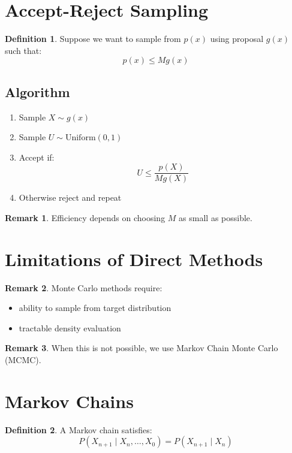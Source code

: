 \documentclass[12pt,oneside]{book}
\numberwithin{equation}{section}
\theoremstyle{definition}
\newtheorem{definition}{Definition}[section]
\newtheorem{remark}{Remark}[section]
\theoremstyle{plain}
\theoremstyle{remark}
\begin{document}
\section{Accept-Reject Sampling}

\begin{definition}
Suppose we want to sample from $p(x)$ using proposal $g(x)$ such that:
$$
p(x) \leq M g(x)
$$
\end{definition}

\subsection{Algorithm}

\begin{enumerate}
\item Sample $X \sim g(x)$
\item Sample $U \sim \text{Uniform}(0,1)$
\item Accept if:
$$
U \leq \frac{p(X)}{M g(X)}
$$
\item Otherwise reject and repeat
\end{enumerate}

\begin{remark}
Efficiency depends on choosing $M$ as small as possible.
\end{remark}

\section{Limitations of Direct Methods}

\begin{remark}
Monte Carlo methods require:
\begin{itemize}
\item ability to sample from target distribution
\item tractable density evaluation
\end{itemize}
\end{remark}

\begin{remark}
When this is not possible, we use Markov Chain Monte Carlo (MCMC).
\end{remark}

\section{Markov Chains}

\begin{definition}
A Markov chain satisfies:
$$
P(X_{n+1} \mid X_n,\dots,X_0) = P(X_{n+1} \mid X_n)
$$
\end{definition}
\end{document}
